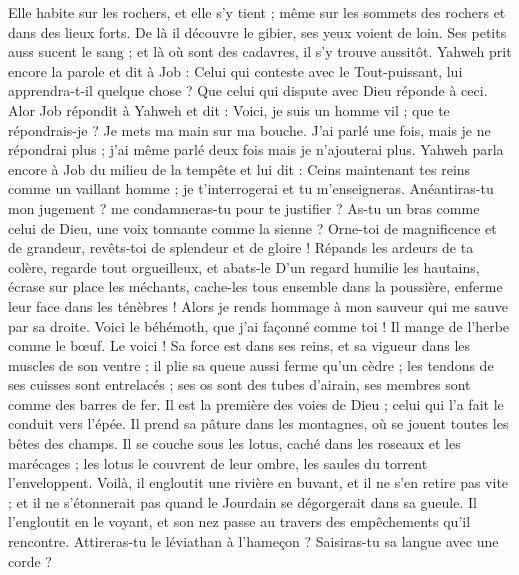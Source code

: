 \begin{multicols}{2}
Elle habite sur les rochers, et elle s'y tient ; même sur les sommets des rochers et dans des lieux forts. 
De là il découvre le gibier, ses yeux voient de loin.
Ses petits auss sucent le sang ; et là où sont des cadavres, il s'y trouve aussitôt.
Yahweh prit encore la parole et dit à Job :
Celui qui conteste avec le Tout-puissant, lui apprendra-t-il quelque chose ? Que celui qui dispute avec Dieu réponde à ceci.
Alor Job répondit à Yahweh et dit :
Voici, je suis un homme vil ; que te répondrais-je ? Je mets ma main sur ma bouche.
J'ai parlé une fois, mais je ne répondrai plus ; j'ai même parlé deux fois mais je n'ajouterai plus.
\VerseOne{}Yahweh parla encore à Job du milieu de la tempête et lui dit :
Ceins maintenant tes reins comme un vaillant homme ; je t'interrogerai et tu m'enseigneras.
Anéantiras-tu mon jugement ? me condamneras-tu pour te justifier ?
As-tu un bras comme celui de Dieu, une voix tonnante comme la sienne ?
Orne-toi de magnificence et de grandeur, revêts-toi de splendeur et de gloire !
Répands les ardeurs de ta colère, regarde tout orgueilleux, et abats-le
D'un regard humilie les hautains, écrase sur place les méchants,
cache-les tous ensemble dans la poussière, enferme leur face dans les ténèbres !
Alors je rends hommage à mon sauveur qui me sauve par sa droite.
Voici le béhémoth, que j'ai façonné comme toi ! Il mange de l'herbe comme le bœuf.
Le voici ! Sa force est dans ses reins, et sa vigueur dans les muscles de son ventre ;
il plie sa queue aussi ferme qu'un cèdre ; les tendons de ses cuisses sont entrelacés ;
ses os sont des tubes d'airain, ses membres sont comme des barres de fer.
Il est la première des voies de Dieu ; celui qui l'a fait le conduit vers l'épée.
Il prend sa pâture dans les montagnes, où se jouent toutes les bêtes des champs.
Il se couche sous les lotus, caché dans les roseaux et les marécages ;
les lotus le couvrent de leur ombre, les saules du torrent l'enveloppent.
Voilà, il engloutit une rivière en buvant, et il ne s'en retire pas vite ; et il ne s'étonnerait pas quand le Jourdain se dégorgerait dans sa gueule. 
Il l'engloutit en le voyant, et son nez passe au travers des empêchements qu'il rencontre.  
Attireras-tu le léviathan à l'hameçon ? Saisiras-tu sa langue avec une corde ?

\end{multicols}
